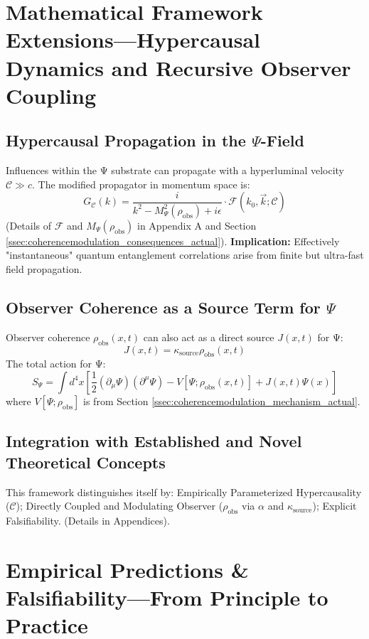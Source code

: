 \documentclass[11pt, a4paper]{book}
\begin{document}
\section{Mathematical Framework Extensions—Hypercausal Dynamics and Recursive Observer Coupling} %
\label{sec:mathframeworkext_mainpaper_actual} %
\subsection{Hypercausal Propagation in the $\Psi$-Field}
\label{ssec:mathframeworkext_hypercausal_actual}
Influences within the Ψ substrate can propagate with a hyperluminal velocity $\mathcal{C} \gg c$. The modified propagator in momentum space is:
\[ G_\mathcal{C}(k) = \frac{i}{k^2 - M_\Psi^2(\rho_{\text{obs}}) + i\epsilon} \cdot \mathcal{F}(k_0, \vec{k}; \mathcal{C}) \]
(Details of $\mathcal{F}$ and $M_\Psi(\rho_{\text{obs}})$ in Appendix A and Section \ref{ssec:coherencemodulation_consequences_actual}).
\textbf{Implication:} Effectively "instantaneous" quantum entanglement correlations arise from finite but ultra-fast field propagation.

\subsection{Observer Coherence as a Source Term for $\Psi$}
\label{ssec:mathframeworkext_recursivecoupling_actual}
Observer coherence $\rho_{\text{obs}}(x,t)$ can also act as a direct source $J(x,t)$ for Ψ:
\[ J(x,t) = \kappa_{\text{source}} \rho_{\text{obs}}(x,t) \]
The total action for Ψ:
\[ S_\Psi = \int d^4x \left[ \frac{1}{2} (\partial_\mu \Psi)(\partial^\mu \Psi) - V[\Psi; \rho_{\text{obs}}(x,t)] + J(x,t)\Psi(x) \right] \]
where $V[\Psi; \rho_{\text{obs}}]$ is from Section \ref{ssec:coherencemodulation_mechanism_actual}.

\subsection{Integration with Established and Novel Theoretical Concepts}
\label{ssec:mathframeworkext_integration_actual}
This framework distinguishes itself by: Empirically Parameterized Hypercausality ($\mathcal{C}$); Directly Coupled and Modulating Observer ($\rho_{\text{obs}}$ via $\alpha$ and $\kappa_{\text{source}}$); Explicit Falsifiability. (Details in Appendices).


\section{Empirical Predictions \& Falsifiability—From Principle to Practice} %
\label{sec:empiricalpredictions_mainpaper_actual} %
\end{document}

